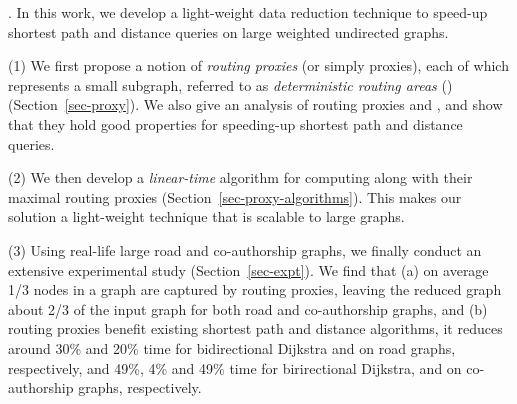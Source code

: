 . In this work, we develop a light-weight data reduction technique to speed-up shortest  path and distance queries on large weighted undirected graphs.



\stab (1) We first propose a notion of {\em routing proxies} (or simply proxies), each of which represents a small subgraph, referred to as  {\em deterministic routing areas} (\dras)  (Section~\ref{sec-proxy}). We also give an analysis of routing proxies and \dras, and show that they hold good properties for speeding-up shortest path and distance queries.

\stab (2) We then develop a {\em linear-time} algorithm for computing \dras along with their maximal routing proxies (Section~\ref{sec-proxy-algorithms}). This makes our solution a light-weight technique that is scalable to large graphs.


\stab (3) Using real-life large road and co-authorship graphs, we finally conduct an extensive experimental study (Section~\ref{sec-expt}).
We find that (a) on average 1/3 nodes in a graph are captured by routing proxies, leaving the reduced graph about 2/3 of the input graph for both road and co-authorship graphs, and  (b) routing proxies benefit existing shortest  path and distance algorithms, \eg it reduces around 30\% and 20\% time for  bidirectional Dijkstra \cite{LubyR89} and \arcflag \cite{MohringSSWW05} on road graphs, respectively, and 49\%, 4\% and 49\% time for birirectional Dijkstra, \arcflag and \tnr \cite{arz2013transit} on co-authorship graphs, respectively.








